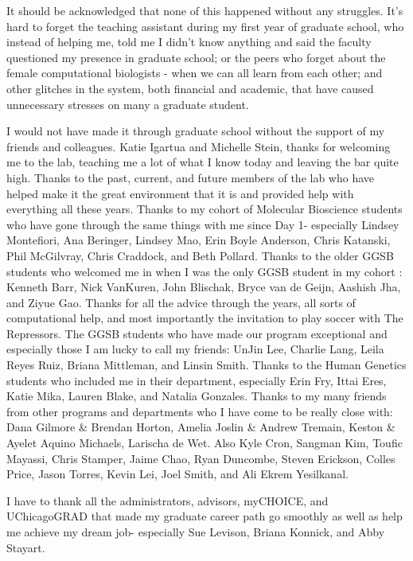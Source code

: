 It should be acknowledged that none of this happened without any struggles. It's hard to forget the teaching assistant during my first year of graduate school, who instead of helping me, told me I didn't know anything and said the faculty questioned my presence in graduate school; or the peers who forget about the female computational biologists - when we can all learn from each other; and other glitches in the system, both financial and academic, that have caused unnecessary stresses on many a graduate student.

I would not have made it through graduate school without the support of my friends and colleagues. Katie Igartua and Michelle Stein, thanks for welcoming me to the lab, teaching me a lot of what I know today and leaving the bar quite high. Thanks to the past, current, and future members of the lab who have helped make it the great environment that it is and provided help with everything all these years. Thanks to my cohort of Molecular Bioscience students who have gone through the same things with me since Day 1- especially Lindsey Montefiori, Ana Beringer, Lindsey Mao, Erin Boyle Anderson, Chris Katanski, Phil McGilvray, Chris Craddock, and Beth Pollard. Thanks to the older GGSB students who welcomed me in when I was the only GGSB student in my cohort : Kenneth Barr, Nick VanKuren, John Blischak, Bryce van de Geijn, Aashish Jha, and Ziyue Gao. Thanks for all the advice through the years, all sorts of computational help, and most importantly the invitation to play soccer with The Repressors. The GGSB students who have made our program exceptional and especially those I am lucky to call my friends: UnJin Lee, Charlie Lang, Leila Reyes Ruiz, Briana Mittleman, and Linsin Smith. Thanks to the Human Genetics students who included me in their department, especially Erin Fry, Ittai Eres, Katie Mika, Lauren Blake, and Natalia Gonzales. 
Thanks to my many friends from other programs and departments who I have come to be really close with: Dana Gilmore \& Brendan Horton, Amelia Joslin \& Andrew Tremain, Keston \& Ayelet Aquino Michaels, Larischa de Wet. Also Kyle Cron, Sangman Kim, Toufic Mayassi, Chris Stamper, Jaime Chao, Ryan Duncombe, Steven Erickson, Colles Price, Jason Torres, Kevin Lei, Joel Smith, and Ali Ekrem Yesilkanal. 

I have to thank all the administrators, advisors, myCHOICE, and UChicagoGRAD that made my graduate career path go smoothly as well as help me achieve my dream job- especially Sue Levison, Briana Konnick, and Abby Stayart. 

